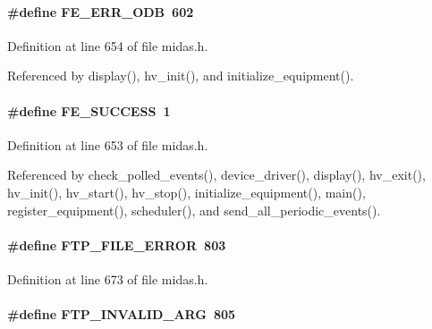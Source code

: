 \paragraph[{FE\_\-ERR\_\-ODB}]{\setlength{\rightskip}{0pt plus 5cm}\#define FE\_\-ERR\_\-ODB~602}\hfill\label{group__err26_ga8a0cc5de6ea758c61231a11b6a076e1f}

\begin{DoxyItemize}
\item 
\end{DoxyItemize}

Definition at line 654 of file midas.h.

Referenced by display(), hv\_\-init(), and initialize\_\-equipment().
\paragraph[{FE\_\-SUCCESS}]{\setlength{\rightskip}{0pt plus 5cm}\#define FE\_\-SUCCESS~1}\hfill\label{group__err26_ga23395a243c74edd61ed4ce0df1256419}

\begin{DoxyItemize}
\item 
\end{DoxyItemize}

Definition at line 653 of file midas.h.

Referenced by check\_\-polled\_\-events(), device\_\-driver(), display(), hv\_\-exit(), hv\_\-init(), hv\_\-start(), hv\_\-stop(), initialize\_\-equipment(), main(), register\_\-equipment(), scheduler(), and send\_\-all\_\-periodic\_\-events().
\paragraph[{FTP\_\-FILE\_\-ERROR}]{\setlength{\rightskip}{0pt plus 5cm}\#define FTP\_\-FILE\_\-ERROR~803}\hfill\label{group__err26_ga8f62a67a3788241e74228be45c8d1334}

\begin{DoxyItemize}
\item 
\end{DoxyItemize}

Definition at line 673 of file midas.h.
\paragraph[{FTP\_\-INVALID\_\-ARG}]{\setlength{\rightskip}{0pt plus 5cm}\#define FTP\_\-INVALID\_\-ARG~805}\hfill\label{group__err26_ga96fa3686e25d0b43ec2c504cc831551d}

